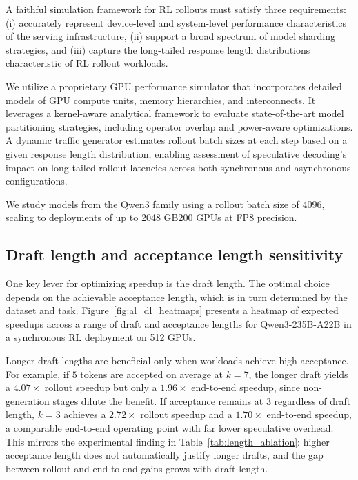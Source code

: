 \documentclass[11pt, logo, onecolumn, copyright, colorlinks=true, allcolors=blue]{nvidiatechreport}
\begin{document}
A faithful simulation framework for RL rollouts must satisfy three requirements: (i) accurately represent device-level and system-level performance characteristics of the serving infrastructure, (ii) support a broad spectrum of model sharding strategies, and (iii) capture the long-tailed response length distributions characteristic of RL rollout workloads.

We utilize a proprietary GPU performance simulator that incorporates detailed models of GPU compute units, memory hierarchies, and interconnects. It leverages a kernel-aware analytical framework to evaluate state-of-the-art model partitioning strategies, including operator overlap and power-aware optimizations. A dynamic traffic generator estimates rollout batch sizes at each step based on a given response length distribution, enabling assessment of speculative decoding's impact on long-tailed rollout latencies across both synchronous and asynchronous configurations.

We study models from the Qwen3 family using a rollout batch size of 4096, scaling to deployments of up to 2048 GB200 GPUs at FP8 precision.

\subsection{Draft length and acceptance length sensitivity}
One key lever for optimizing speedup is the draft length. The optimal choice depends on the achievable acceptance length, which is in turn determined by the dataset and task. Figure~\ref{fig:al_dl_heatmaps} presents a heatmap of expected speedups across a range of draft and acceptance lengths for Qwen3-235B-A22B in a synchronous RL deployment on 512 GPUs.

Longer draft lengths are beneficial only when workloads achieve high acceptance. For example, if $5$ tokens are accepted on average at $k=7$, the longer draft yields a $4.07\times$ rollout speedup but only a $1.96\times$ end-to-end speedup, since non-generation stages dilute the benefit. If acceptance remains at $3$ regardless of draft length, $k=3$ achieves a $2.72\times$ rollout speedup and a $1.70\times$ end-to-end speedup, a comparable end-to-end operating point with far lower speculative overhead. This mirrors the experimental finding in Table~\ref{tab:length_ablation}: higher acceptance length does not automatically justify longer drafts, and the gap between rollout and end-to-end gains grows with draft length.
\end{document}
